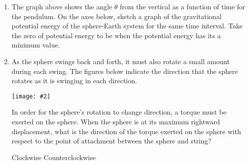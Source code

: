 \documentclass[11pt]{article}
\newcommand{\pic}[2]{
  \begin{center}\texttt{[image: \#2]}\end{center}
}
\begin{document}
\begin{enumerate}
\begin{enumerate}[resume]
    \begin{center}
    \end{center}
  \item The graph above shows the angle $\theta$ from the vertical as a function
    of time for the pendulum. On the axes below, sketch a graph of the
    gravitational potential energy of the sphere-Earth system for the same time
    interval. Take the zero of potential energy to be when the potential energy
    has its a minimum value.
    \begin{center}
    \end{center}
  \item As the sphere swings back and forth, it must also rotate a small amount
    during each swing. The figures below indicate the direction that the sphere
    rotates as it is swinging in each direction.
    \pic{.5}{swings}
    In order for the sphere's rotation to change direction, a torque must be
    exerted on the sphere. When the sphere is at its maximum rightward
    displacement, what is the direction of the torque exerted on the sphere
    with respect to the point of attachment between the sphere and string?

    \vspace{.1in}
    \underline{\hspace{.3in}} Clockwise\hspace{.3in}
    \underline{\hspace{.3in}} Counterclockwise
        

\end{enumerate}
\end{enumerate}
\end{document}

